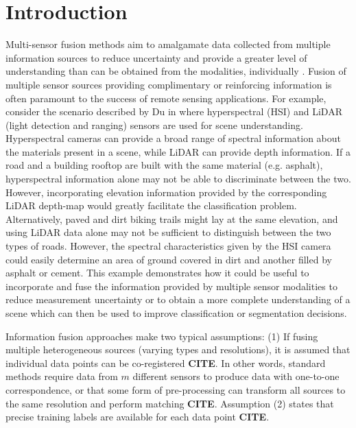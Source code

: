 \chapter{Introduction}
\vspace{1cm}
Multi-sensor fusion methods aim to amalgamate data collected from multiple information sources to reduce uncertainty and provide a greater level of understanding than can be obtained from the modalities, individually \cite{hackett1990multisensorfusion}.  Fusion of multiple sensor sources providing complimentary or reinforcing information is often paramount to the success of remote sensing applications.  For example, consider the scenario described by Du in \cite{Du2017Thesis} where hyperspectral (HSI) and LiDAR (light detection and ranging) sensors are used for scene understanding. Hyperspectral cameras can provide a broad range of spectral information about the materials present in a scene, while LiDAR can provide depth information.  If a road and a building rooftop are built with the same material (e.g. asphalt), hyperspectral information alone may not be able to discriminate between the two. However, incorporating elevation information provided by the corresponding LiDAR depth-map would greatly facilitate the classification problem.  Alternatively, paved and dirt biking trails might lay at the same elevation, and using LiDAR data alone may not be sufficient to distinguish between the two types of roads.  However, the spectral characteristics given by the HSI camera could easily determine an area of ground covered in dirt and another filled by asphalt or cement.  This example demonstrates how it could be useful to incorporate and fuse the information provided by multiple sensor modalities to reduce measurement uncertainty or to obtain a more complete understanding of a scene which can then be used to improve classification or segmentation decisions.
\newline

Information fusion approaches make two typical assumptions: (1) If fusing multiple heterogeneous sources (varying types and resolutions), it is assumed that individual data points can be co-registered \textbf{CITE}. In other words, standard methods require data from $m$ different sensors to produce data with one-to-one correspondence, or that some form of pre-processing can transform all sources to the same resolution and perform matching \textbf{CITE}.  Assumption (2) states that precise training labels are available for each data point \textbf{CITE}. 
\newline 


